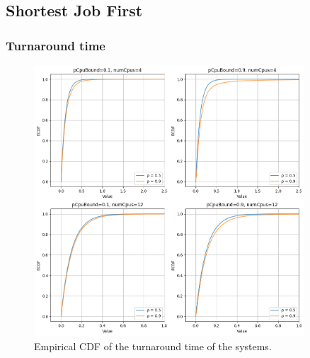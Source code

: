 
\subsection{Shortest Job First}


\subsubsection{Turnaround time}

\begin{figure}[H]
    \captionsetup{type=figure}
    \centering
    \includegraphics[width=0.9\textwidth]{./images/04/sjf/turn/ecdf.png}
    \caption{Empirical CDF of the turnaround time of the systems.}
    \label{fig:sjfTurnEcdf}
\end{figure}

